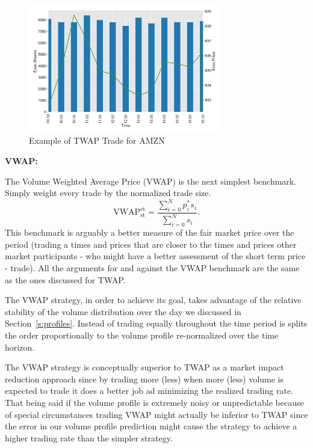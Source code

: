         \begin{figure}[!ht]
        \centering
        \includegraphics[width=0.75\textwidth]{chapters/chapter_exec_models/figures/twap.png} 
        \caption{Example of TWAP Trade for AMZN \label{fig:vwap}}
        \end{figure}


\noindent\textbf{VWAP:} 


The Volume Weighted Average Price (VWAP) is the next simplest benchmark. Simply weight every trade by the normalized trade size.
        \begin{equation}
        \text{VWAP}_{\text{st}} ^{\text{et}}= \dfrac{ \sum_{i=0}^N p_i^* s_i }{ \sum_{i=0}^N s_i }.
        \end{equation}
This benchmark  is arguably a better measure of the fair market price over the period (trading a times and prices that are closer to the times and prices other market participants - who might have a better assessment of the short term price - trade). All the arguments for and against the VWAP benchmark are the same as the ones discussed for TWAP.


The VWAP strategy, in order to achieve its goal, takes advantage of the relative stability of the volume distribution over the day we discussed in Section~\ref{s:profiles}. Instead of trading equally throughout the time period is splits the order proportionally to the volume profile re-normalized over the time horizon.


The VWAP strategy is conceptually superior to TWAP as a market impact reduction approach since by trading more (less) when more  (less) volume is expected to trade it does a better job ad minimizing the realized trading rate. That being said if the volume profile is extremely noisy or unpredictable because of special circumstances trading VWAP might actually be inferior to TWAP since the error in our volume profile prediction might cause the strategy to achieve a higher trading rate than the simpler strategy.


